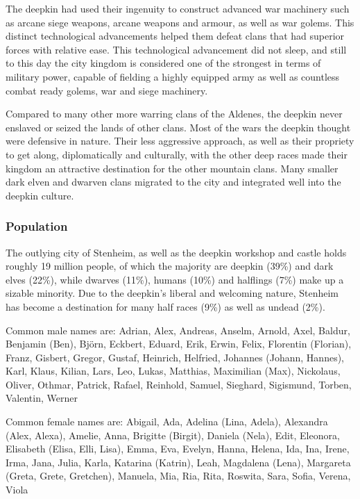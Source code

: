 The deepkin had used their ingenuity to construct advanced war machinery such
as arcane siege weapons, arcane weapons and armour, as well as war
golems. This distinct technological advancements helped them defeat clans that
had superior forces with relative ease. This technological advancement did not
sleep, and still to this day the city kingdom is considered one of the
strongest in terms of military power, capable of fielding a highly equipped
army as well as countless combat ready golems, war and siege machinery.

Compared to many other more warring clans of the Aldenes, the deepkin never
enslaved or seized the lands of other clans. Most of the wars the deepkin
thought were defensive in nature. Their less aggressive approach, as well as
their propriety to get along, diplomatically and culturally, with the other
deep races made their kingdom an attractive destination for the other mountain
clans. Many smaller dark elven and dwarven clans migrated to the city and
integrated well into the deepkin culture.

\subsubsection{Population}

The outlying city of Stenheim, as well as the deepkin workshop and castle holds
roughly 19 million people, of which the majority are deepkin (39\%) and dark
elves (22\%), while dwarves (11\%), humans (10\%) and halflings (7\%) make up a
sizable minority. Due to the deepkin's liberal and welcoming nature, Stenheim
has become a destination for many half races (9\%) as well as undead (2\%).

Common male names are: Adrian, Alex, Andreas, Anselm, Arnold, Axel, Baldur,
Benjamin (Ben), Björn, Eckbert, Eduard, Erik, Erwin, Felix, Florentin
(Florian), Franz, Gisbert, Gregor, Gustaf, Heinrich, Helfried, Johannes
(Johann, Hannes), Karl, Klaus, Kilian, Lars, Leo, Lukas, Matthias,
Maximilian (Max), Nickolaus, Oliver, Othmar, Patrick, Rafael, Reinhold,
Samuel, Sieghard, Sigismund, Torben, Valentin, Werner

Common female names are: Abigail, Ada, Adelina (Lina, Adela), Alexandra (Alex,
Alexa), Amelie, Anna, Brigitte (Birgit), Daniela (Nela), Edit, Eleonora,
Elisabeth (Elisa, Elli, Lisa), Emma, Eva, Evelyn, Hanna, Helena, Ida, Ina,
Irene, Irma, Jana, Julia, Karla, Katarina (Katrin), Leah, Magdalena (Lena),
Margareta (Greta, Grete, Gretchen), Manuela, Mia, Ria, Rita, Roswita, Sara,
Sofia, Verena, Viola

